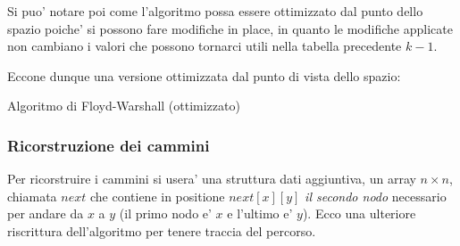 \documentclass{article}
\begin{document}
Si puo' notare poi come l'algoritmo possa essere ottimizzato dal punto dello
spazio poiche' si possono fare modifiche in place, in quanto le modifiche applicate
non cambiano i valori che possono tornarci utili nella tabella precedente $k-1$.

\noindent Eccone dunque una versione ottimizzata dal punto di vista dello spazio:

\begin{algorithm}[H]
  \caption{Algoritmo di Floyd-Warshall (ottimizzato)}
\end{algorithm}

\subsubsection{Ricorstruzione dei cammini}

Per ricorstruire i cammini si usera' una struttura dati aggiuntiva, un array $n \times n$,
chiamata $next$ che contiene in positione $next[x][y]$ \emph{il secondo nodo} necessario
per andare da $x$ a $y$ (il primo nodo e' $x$ e l'ultimo e' $y$).
Ecco una ulteriore riscrittura dell'algoritmo per tenere traccia del percorso.
\end{document}
